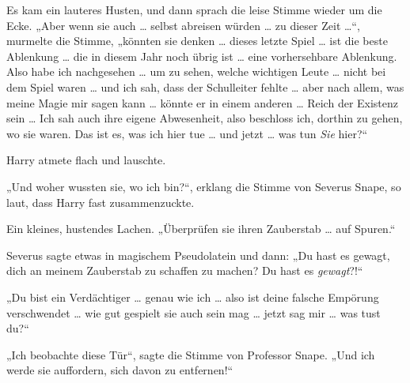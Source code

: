 Es kam ein lauteres Husten, und dann sprach die leise Stimme wieder um die Ecke.
„Aber wenn sie auch … selbst abreisen würden … zu dieser Zeit …“, murmelte die Stimme, „könnten sie denken … dieses letzte Spiel … ist die beste Ablenkung … die in diesem Jahr noch übrig ist … eine vorhersehbare Ablenkung. Also habe ich nachgesehen … um zu sehen, welche wichtigen Leute … nicht bei dem Spiel waren … und ich sah, dass der Schulleiter fehlte … aber nach allem, was meine Magie mir sagen kann … könnte er in einem anderen … Reich der Existenz sein … Ich sah auch ihre eigene Abwesenheit, also beschloss ich, dorthin zu gehen, wo sie waren. Das ist es, was ich hier tue … und jetzt … was tun \emph{Sie} hier?“

Harry atmete flach und lauschte.

„Und woher wussten sie, wo ich bin?“, erklang die Stimme von Severus Snape, so laut, dass Harry fast zusammenzuckte.

Ein kleines, hustendes Lachen.
„Überprüfen sie ihren Zauberstab … auf Spuren.“

Severus sagte etwas in magischem Pseudolatein und dann:
„Du hast es gewagt, dich an meinem Zauberstab zu schaffen zu machen? Du hast es \emph{gewagt}?!“

„Du bist ein Verdächtiger … genau wie ich … also ist deine falsche Empörung verschwendet … wie gut gespielt sie auch sein mag … jetzt sag mir … was tust du?“

„Ich beobachte diese Tür“, sagte die Stimme von Professor Snape.
„Und ich werde sie auffordern, sich davon zu entfernen!“

